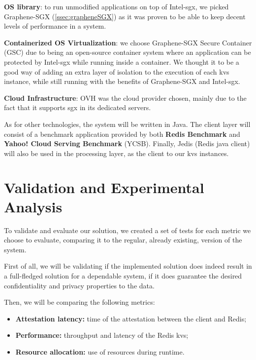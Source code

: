 \textbf{OS library}: to run unmodified applications on top of Intel-\gls{sgx}, we picked Graphene-SGX (\ref{ssec:grapheneSGX}) as it was proven to be able to keep decent levels of performance in a system.

\textbf{Containerized OS Virtualization}: we choose Graphene-SGX Secure Container (GSC) due to being an open-source container system where an application can be protected by Intel-\gls{sgx} while running inside a container. We thought it to be a good way of adding an extra layer of isolation to the execution of each \gls{kvs} instance, while still running with the benefits of Graphene-SGX and Intel-\gls{sgx}.

\textbf{Cloud Infrastructure}: OVH \cite{ovhCloud} was the cloud provider chosen, mainly due to the fact that it supports \gls{sgx} in its dedicated servers.

As for other technologies, the system will be written in Java. The client layer will consist of a benchmark application provided by both \textbf{Redis Benchmark} and \textbf{Yahoo! Cloud Serving Benchmark} (YCSB). Finally, Jedis (Redis java client) will also be used in the processing layer, as the client to our \gls{kvs} instances.

\section{Validation and Experimental Analysis} %
\label{sec:floats_figures_and_captions}

To validate and evaluate our solution, we created a set of tests for each metric we choose to evaluate, comparing it to the regular, already existing, version of the system. 

First of all, we will be validating if the implemented solution does indeed result in a full-fledged solution for a dependable system, if it does guarantee the desired confidentiality and privacy properties to the data.

Then, we will be comparing the following metrics:

\begin{itemize}
	\item \textbf{Attestation latency:} time of the attestation between the client and Redis;
	\item \textbf{Performance:} throughput and latency of the Redis \gls{kvs};
	\item \textbf{Resource allocation:} use of resources during runtime.
\end{itemize}

